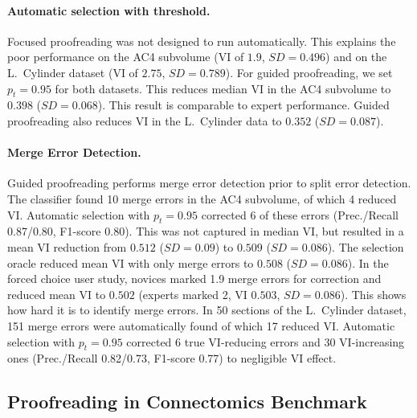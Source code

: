 \paragraph{Automatic selection with threshold.} Focused proofreading was not designed to run automatically. This explains the poor performance on the AC4 subvolume (VI of $1.9$, $SD=0.496$) and on the L.~Cylinder dataset (VI of $2.75$, $SD=0.789$). For guided proofreading, we set $p_t=0.95$ for both datasets. This reduces median VI in the AC4 subvolume to $0.398$ ($SD=0.068$). This result is comparable to expert performance. Guided proofreading also reduces VI in the L.~Cylinder data to $0.352$ ($SD=0.087$).

\paragraph{Merge Error Detection.} Guided proofreading performs merge error detection prior to split error detection. The classifier found 10 merge errors in the AC4 subvolume, of which 4 reduced VI. Automatic selection with $p_t=0.95$ corrected 6 of these errors (Prec./Recall 0.87/0.80, F1-score 0.80). This was not captured in median VI, but resulted in a mean VI reduction from $0.512$ ($SD=0.09$) to $0.509$ ($SD=0.086$). The selection oracle reduced mean VI with only merge errors to $0.508$ ($SD=0.086$). In the forced choice user study, novices marked 1.9 merge errors for correction and reduced mean VI to $0.502$ (experts marked 2, VI $0.503$, $SD=0.086$). This shows how hard it is to identify merge errors. In 50 sections of the L.~Cylinder dataset, 151 merge errors were automatically found of which 17 reduced VI. Automatic selection with $p_t=0.95$ corrected 6 true VI-reducing errors and 30 VI-increasing ones (Prec./Recall 0.82/0.73, F1-score 0.77) to negligible VI effect. 

\subsection{Proofreading in Connectomics Benchmark}


